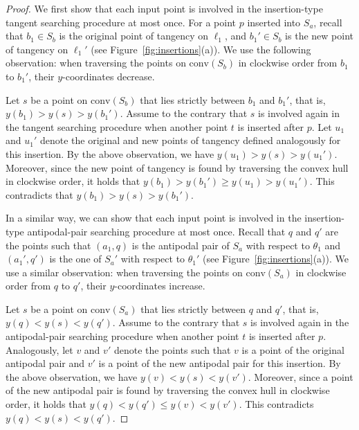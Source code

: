 \documentclass[10pt,a4paper]{article}
\theoremstyle{star}
\theoremstyle{claimstar}
\newcommand{\conv}{\ensuremath{\mathrm{conv}}}
\begin{document}
\begin{proof}
    We first show that each input point is involved in the insertion-type tangent searching procedure at most once.
    For a point $p$ inserted into $S_a$, recall that $b_1 \in S_b$ is the original point of tangency on $\ell_1$, and $b_1' \in S_b$ is the new point of tangency on $\ell_1'$ (see Figure~\ref{fig:insertions}(a)).
    We use the following observation:
    when traversing the points on $\conv(S_b)$ in clockwise order from $b_1$ to $b_1'$, their $y$-coordinates decrease.
    
    Let $s$ be a point on $\conv(S_b)$ that lies strictly between $b_1$ and $b_1'$, that is, $y(b_1) > y(s) > y(b_1')$.
    Assume to the contrary that $s$ is involved again in the tangent searching procedure when another point $t$ is inserted after $p$.
    Let $u_1$ and $u_1'$ denote the original and new points of tangency defined analogously for this insertion.
    By the above observation, we have $y(u_1) > y(s) > y(u_1')$.
    Moreover, since the new point of tangency is found by traversing the convex hull in clockwise order, 
    it holds that $y(b_1) > y(b_1') \ge y(u_1) > y(u_1')$.
    This contradicts that $y(b_1) > y(s) > y(b_1')$.

    In a similar way, we can show that each input point is involved in the insertion-type antipodal-pair searching procedure at most once.
    Recall that $q$ and $q'$ are the points such that $(a_1, q)$ is the antipodal pair of $S_a$ with respect to $\theta_1$ and $(a_1',q')$ is the one of $S_a'$ with respect to $\theta_1'$ (see Figure~\ref{fig:insertions}(a)). 
    We use a similar observation: when traversing the points on $\conv(S_a)$ in clockwise order from $q$ to $q'$, their $y$-coordinates increase.
    
    Let $s$ be a point on $\conv(S_a)$ that lies strictly between $q$ and $q'$, that is, $y(q) < y(s) < y(q')$.
    Assume to the contrary that $s$ is involved again in the antipodal-pair searching procedure when another point $t$ is inserted after $p$.
    Analogously, let $v$ and $v'$ denote the points such that $v$ is a point of the original antipodal pair and $v'$ is a point of the new antipodal pair for this insertion.
    By the above observation, we have $y(v) < y(s) < y(v')$.
    Moreover, since a point of the new antipodal pair is found by traversing the convex hull in clockwise order, 
    it holds that $y(q) < y(q') \le y(v) < y(v')$.
    This contradicts $y(q) < y(s) < y(q')$.
\end{proof}
\end{document}
